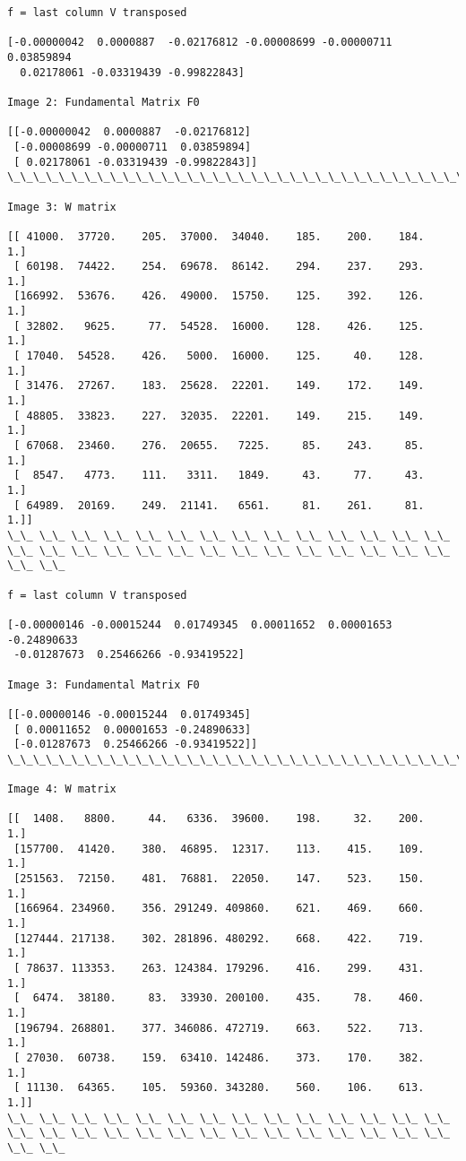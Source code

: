 \documentclass[11pt]{article}
\begin{document}
\begin{Verbatim}[commandchars=\\\{\}]
f = last column V transposed 

[-0.00000042  0.0000887  -0.02176812 -0.00008699 -0.00000711  0.03859894
  0.02178061 -0.03319439 -0.99822843]

Image 2: Fundamental Matrix F0

[[-0.00000042  0.0000887  -0.02176812]
 [-0.00008699 -0.00000711  0.03859894]
 [ 0.02178061 -0.03319439 -0.99822843]]
\_\_\_\_\_\_\_\_\_\_\_\_\_\_\_\_\_\_\_\_\_\_\_\_\_\_\_\_\_\_\_\_\_\_\_\_\_\_\_\_\_\_\_\_\_\_\_\_\_\_\_\_\_\_\_\_\_\_\_\_\_\_\_\_\_\_\_\_\_\_\_\_\_\_\_\_\_\_\_\_\_\_\_\_

Image 3: W matrix

[[ 41000.  37720.    205.  37000.  34040.    185.    200.    184.      1.]
 [ 60198.  74422.    254.  69678.  86142.    294.    237.    293.      1.]
 [166992.  53676.    426.  49000.  15750.    125.    392.    126.      1.]
 [ 32802.   9625.     77.  54528.  16000.    128.    426.    125.      1.]
 [ 17040.  54528.    426.   5000.  16000.    125.     40.    128.      1.]
 [ 31476.  27267.    183.  25628.  22201.    149.    172.    149.      1.]
 [ 48805.  33823.    227.  32035.  22201.    149.    215.    149.      1.]
 [ 67068.  23460.    276.  20655.   7225.     85.    243.     85.      1.]
 [  8547.   4773.    111.   3311.   1849.     43.     77.     43.      1.]
 [ 64989.  20169.    249.  21141.   6561.     81.    261.     81.      1.]]
\_\_ \_\_ \_\_ \_\_ \_\_ \_\_ \_\_ \_\_ \_\_ \_\_ \_\_ \_\_ \_\_ \_\_ \_\_ \_\_ \_\_ \_\_ \_\_ \_\_ \_\_ \_\_ \_\_ \_\_ \_\_ \_\_ \_\_ \_\_ \_\_ \_\_

f = last column V transposed 

[-0.00000146 -0.00015244  0.01749345  0.00011652  0.00001653 -0.24890633
 -0.01287673  0.25466266 -0.93419522]

Image 3: Fundamental Matrix F0

[[-0.00000146 -0.00015244  0.01749345]
 [ 0.00011652  0.00001653 -0.24890633]
 [-0.01287673  0.25466266 -0.93419522]]
\_\_\_\_\_\_\_\_\_\_\_\_\_\_\_\_\_\_\_\_\_\_\_\_\_\_\_\_\_\_\_\_\_\_\_\_\_\_\_\_\_\_\_\_\_\_\_\_\_\_\_\_\_\_\_\_\_\_\_\_\_\_\_\_\_\_\_\_\_\_\_\_\_\_\_\_\_\_\_\_\_\_\_\_

Image 4: W matrix

[[  1408.   8800.     44.   6336.  39600.    198.     32.    200.      1.]
 [157700.  41420.    380.  46895.  12317.    113.    415.    109.      1.]
 [251563.  72150.    481.  76881.  22050.    147.    523.    150.      1.]
 [166964. 234960.    356. 291249. 409860.    621.    469.    660.      1.]
 [127444. 217138.    302. 281896. 480292.    668.    422.    719.      1.]
 [ 78637. 113353.    263. 124384. 179296.    416.    299.    431.      1.]
 [  6474.  38180.     83.  33930. 200100.    435.     78.    460.      1.]
 [196794. 268801.    377. 346086. 472719.    663.    522.    713.      1.]
 [ 27030.  60738.    159.  63410. 142486.    373.    170.    382.      1.]
 [ 11130.  64365.    105.  59360. 343280.    560.    106.    613.      1.]]
\_\_ \_\_ \_\_ \_\_ \_\_ \_\_ \_\_ \_\_ \_\_ \_\_ \_\_ \_\_ \_\_ \_\_ \_\_ \_\_ \_\_ \_\_ \_\_ \_\_ \_\_ \_\_ \_\_ \_\_ \_\_ \_\_ \_\_ \_\_ \_\_ \_\_


\end{Verbatim}
\end{document}
